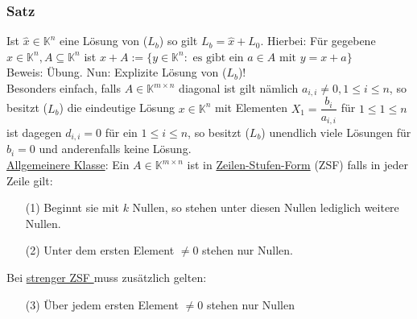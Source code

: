\subsubsection{Satz}
Ist $\hat{x}\in\mathbb{K}^n$ eine Lösung von ($L_b$) so gilt $L_b=\hat{x}+L_0$.  Hierbei: Für gegebene $x\in\mathbb{K}^n,A\subseteq \mathbb{K}^n$ ist $x+A:=\{y\in \mathbb{K}^n:\text{ es gibt ein }a\in A\text{ mit } y=x+a\}$\\
Beweis: Übung.
Nun: Explizite Lösung von ($L_b$)!\\
Besonders einfach, falls $A\in\mathbb{K}^{m\times n}$ diagonal ist gilt nämlich $a_{i,i}\not=0,1\leq i\leq n$, so besitzt ($L_b$) die eindeutige Lösung $x\in\mathbb{K}^n$ mit Elementen $X_1=\dfrac{b_i}{a_{i,i}}$ für $1\leq 1\leq n$ ist dagegen $d_{i,i}=0$ für ein $1\leq i\leq n$, so besitzt ($L_b$) unendlich viele Lösungen für $b_i=0$ und anderenfalls keine Lösung.\\
\underline{Allgemeinere Klasse}: Ein $A\in \mathbb{K}^{m\times n}$ ist in \underline{Zeilen-Stufen-Form} (ZSF) falls in jeder Zeile gilt:
\begin{enumerate}
\item[(1)] Beginnt sie mit $k$ Nullen, so stehen unter diesen Nullen lediglich weitere Nullen.\\
\item[(2)] Unter dem ersten Element $\not= 0$ stehen nur Nullen.\\
\end{enumerate}
Bei \underline{strenger ZSF } muss zusätzlich gelten:
\begin{enumerate}
\item[(3)] Über jedem ersten Element $\not= 0$ stehen nur Nullen\\
\end{enumerate}
